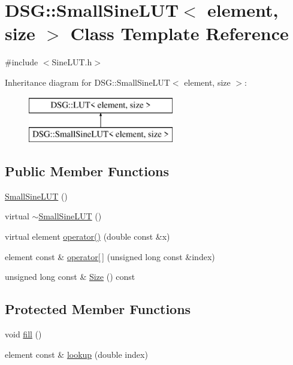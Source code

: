\hypertarget{classDSG_1_1SmallSineLUT}{\section{D\+S\+G\+:\+:Small\+Sine\+L\+U\+T$<$ element, size $>$ Class Template Reference}
\label{classDSG_1_1SmallSineLUT}
}


{\ttfamily \#include $<$Sine\+L\+U\+T.\+h$>$}

Inheritance diagram for D\+S\+G\+:\+:Small\+Sine\+L\+U\+T$<$ element, size $>$\+:\begin{figure}[H]
\begin{center}
\leavevmode
\includegraphics[height=2.000000cm]{classDSG_1_1SmallSineLUT}
\end{center}
\end{figure}
\subsection*{Public Member Functions}
\begin{DoxyCompactItemize}
\item 
\hyperlink{classDSG_1_1SmallSineLUT_a0349b9a15a4eec29de84900eb418248d}{Small\+Sine\+L\+U\+T} ()
\item 
virtual \hyperlink{classDSG_1_1SmallSineLUT_a19944103ae4a2c92eec8105dfa6f03b3}{$\sim$\+Small\+Sine\+L\+U\+T} ()
\item 
virtual element \hyperlink{classDSG_1_1SmallSineLUT_a411742ddafa9551ea099f644dd88e75e}{operator()} (double const \&x)
\item 
element const \& \hyperlink{classDSG_1_1LUT_a5f3bc252bd650fae13046e7959b94f81}{operator\mbox{[}$\,$\mbox{]}} (unsigned long const \&index)
\item 
unsigned long const \& \hyperlink{classDSG_1_1LUT_a2d1a2112f9e960c7b70882a19d670ff9}{Size} () const 
\end{DoxyCompactItemize}
\subsection*{Protected Member Functions}
\begin{DoxyCompactItemize}
\item 
void \hyperlink{classDSG_1_1SmallSineLUT_a3c0e550d2bc8b96ab430a4c290254d70}{fill} ()
\item 
element const \& \hyperlink{classDSG_1_1SmallSineLUT_a2835eea620f319931b60af632b696d9d}{lookup} (double index)
\end{DoxyCompactItemize}
